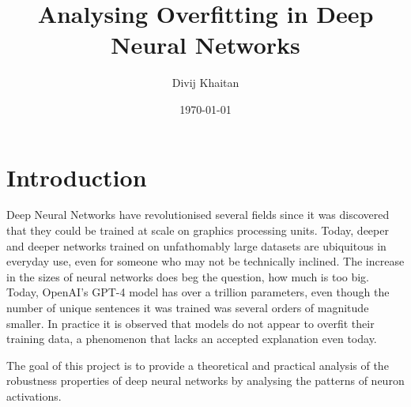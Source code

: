 \documentclass{article}
\title{Analysing Overfitting in Deep Neural Networks}
\author{Divij Khaitan}
\date{\today}
\begin{document}
    \maketitle

    \section{Introduction}
        Deep Neural Networks have revolutionised several fields since it was discovered that they could be trained at scale on graphics processing units. Today, deeper and deeper networks trained on unfathomably large datasets are ubiquitous in everyday use, even for someone who may not be technically inclined. The increase in the sizes of neural networks does beg the question, how much is too big. Today, OpenAI's GPT-4 model has over a trillion parameters, even though the number of unique sentences it was trained was several orders of magnitude smaller. In practice it is observed that models do not appear to overfit their training data, a phenomenon that lacks an accepted explanation even today.
        
        The goal of this project is to provide a theoretical and practical analysis of the robustness properties of deep neural networks by analysing the patterns of neuron activations. 
\end{document}
